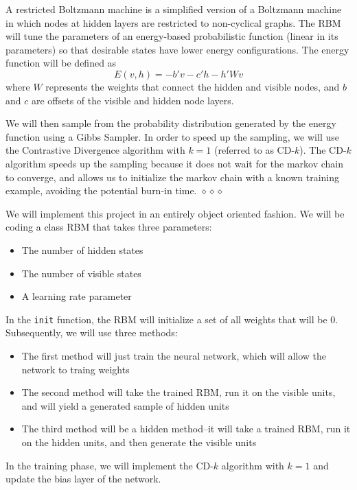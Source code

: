 A restricted Boltzmann machine is a simplified version of a Boltzmann machine in which nodes at hidden layers are restricted to non-cyclical graphs. The RBM will tune the parameters of an energy-based probabilistic function (linear in its parameters) so that desirable states have lower energy configurations. The energy function will be defined as 
$$
E(v,h) = -b'v - c'h -h'Wv
$$ 
where $W$ represents the weights that connect the hidden and visible nodes, and $b$ and $c$ are offsets of the visible and hidden node layers.

We will then sample from the probability distribution generated by the energy function using a Gibbs Sampler. In order to speed up the sampling, we will use the Contrastive Divergence algorithm with $k=1$ (referred to as CD-$k$). The CD-$k$ algorithm speeds up the sampling because it does not wait for the markov chain to converge, and allows us to initialize the markov chain with a known training example, avoiding the potential burn-in time. $\diamond \diamond \diamond$

We will implement this project in an entirely object oriented fashion. We will be coding a class RBM that takes three parameters:
\begin{itemize}
  \item The number of hidden states
  \item The number of visible states
  \item A learning rate parameter
\end{itemize}

In the \texttt{init} function, the RBM will initialize a set of all weights that will be 0. Subsequently, we will use three methods:
\begin{itemize}
  \item The first method will just train the neural network, which will allow the network to traing weights
  \item The second method will take the trained RBM, run it on the visible units, and will yield a generated sample of hidden units
  \item The third method will be a hidden method--it will take a trained RBM, run it on the hidden units, and then generate the visible units
\end{itemize}

In the training phase, we will implement the CD-$k$ algorithm with $k = 1$ and update the bias layer of the network. 

